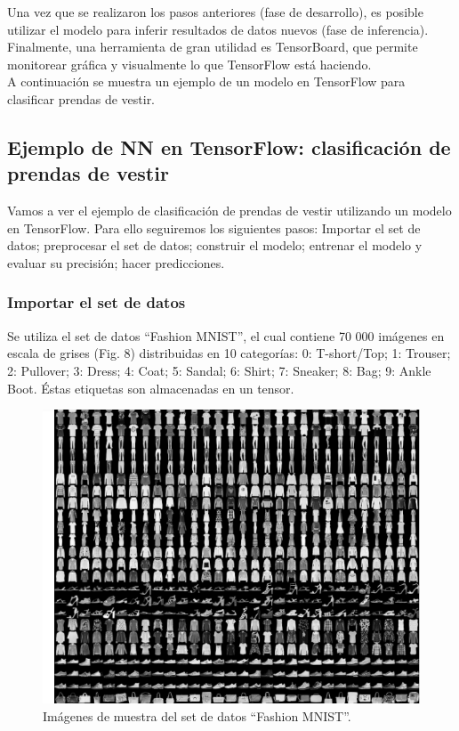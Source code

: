 \documentclass{article}
\begin{document}
Una vez que se realizaron los pasos anteriores (fase de desarrollo), es posible utilizar el modelo para inferir resultados de datos nuevos (fase de inferencia).\\

Finalmente, una herramienta de gran utilidad es TensorBoard, que permite monitorear gráfica y visualmente lo que TensorFlow está haciendo.\\

A continuación se muestra un ejemplo de un modelo en TensorFlow para clasificar prendas de vestir.

\subsection{Ejemplo de NN en TensorFlow: clasificación de prendas de vestir}
Vamos a ver el ejemplo de clasificación de prendas de vestir utilizando un modelo en TensorFlow. Para ello seguiremos los siguientes pasos: Importar el set de datos; preprocesar el set de datos; construir el modelo; entrenar el modelo y evaluar su precisión; hacer predicciones.

\subsubsection{Importar el set de datos}
Se utiliza el set de datos ``Fashion MNIST'', el cual contiene 70 000 imágenes en escala de grises (Fig. 8) distribuidas en 10 categorías: 0: T-short/Top; 1: Trouser; 2: Pullover; 3: Dress; 4: Coat; 5: Sandal; 6: Shirt; 7: Sneaker; 8: Bag; 9: Ankle Boot. Éstas etiquetas son almacenadas en un tensor.

\begin{figure}[th!]
   \includegraphics[width=\textwidth]{prendas.png}
   \caption{Imágenes de muestra del set de datos ``Fashion MNIST''.}
\end{figure}
\end{document}
